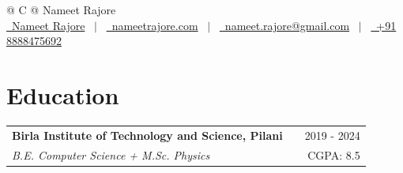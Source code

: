 \documentclass[a4paper,9pt]{article}
\makeatletter
\newcommand{\educationitem}[4]{
    \begin{tabularx}{\linewidth}{@{}l X r@{}}
    \textbf{#1} & & #3 \\
    \textit{#2} & & #4 \\[3.75pt]
    \end{tabularx}
}
\makeatother
\begin{document}
\pagestyle{empty} 


\vspace{-2mm}
\begin{tabularx}{\linewidth}{@{} C @{}}
\Huge{Nameet Rajore} \\[7.5pt]
\href{https://linkedin.com/in/nameet-rajore}{\raisebox{-0.05\height}\faLinkedin\ Nameet Rajore} \ $|$ \ 
\href{https://nameetrajore.com}{\raisebox{-0.05\height}\faGlobe \ nameetrajore.com} \ $|$ \ 
\href{mailto:nameet.rajore@gmail.com}{\raisebox{-0.05\height}\faEnvelope \ nameet.rajore@gmail.com} \ $|$ \ 
\href{tel:+918888475692}{\raisebox{-0.05\height}\faMobile \ +91 8888475692} \\
\end{tabularx}

\section{Education}
\educationitem{Birla Institute of Technology and Science, Pilani}{B.E. Computer Science + M.Sc. Physics}{2019 - 2024}{CGPA: 8.5}

\end{document}
